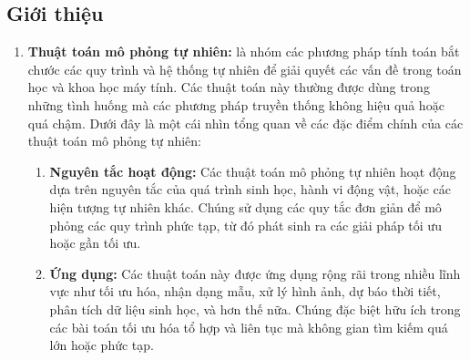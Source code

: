 \documentclass[14pt]{article}
\begin{document}
	\subsection{Giới thiệu}
	\begin{enumerate}

		\item\textbf{Thuật toán mô phỏng tự nhiên:} là nhóm các phương pháp tính toán bắt chước các quy trình và hệ thống tự nhiên để giải quyết các vấn đề trong toán học và khoa học máy tính. Các thuật toán này thường được dùng trong những tình huống mà các phương pháp truyền thống không hiệu quả hoặc quá chậm. Dưới đây là một cái nhìn tổng quan về các đặc điểm chính của các thuật toán mô phỏng tự nhiên:
		\begin{enumerate}
			\item \textbf{Nguyên tắc hoạt động:} Các thuật toán mô phỏng tự nhiên hoạt động dựa trên nguyên tắc của quá trình sinh học, hành vi động vật, hoặc các hiện tượng tự nhiên khác. Chúng sử dụng các quy tắc đơn giản để mô phỏng các quy trình phức tạp, từ đó phát sinh ra các giải pháp tối ưu hoặc gần tối ưu.
			\item \textbf{Ứng dụng:} Các thuật toán này được ứng dụng rộng rãi trong nhiều lĩnh vực như tối ưu hóa, nhận dạng mẫu, xử lý hình ảnh, dự báo thời tiết, phân tích dữ liệu sinh học, và hơn thế nữa. Chúng đặc biệt hữu ích trong các bài toán tối ưu hóa tổ hợp và liên tục mà không gian tìm kiếm quá lớn hoặc phức tạp.
		\end{enumerate}
		


\end{enumerate}
\end{document}
